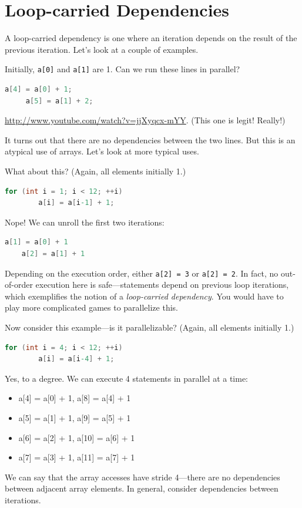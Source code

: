 \documentclass[a4paper]{report}
\begin{document}
\section*{Loop-carried Dependencies}
A loop-carried dependency is one where an
iteration depends on the result of the previous iteration. Let's look
at a couple of examples.


Initially, {\tt a[0]} and {\tt a[1]} are 1.
Can we run these lines in parallel?

\begin{lstlisting}[language=C]
     a[4] = a[0] + 1;
     a[5] = a[1] + 2;
\end{lstlisting}

\url{http://www.youtube.com/watch?v=jjXyqcx-mYY}. (This one is legit! Really!)

It turns out that there are no dependencies between the two lines. But this is
an atypical use of arrays. Let's look at more typical uses.


What about this? (Again, all elements initially 1.)

\begin{lstlisting}[language=C]
    for (int i = 1; i < 12; ++i)
        a[i] = a[i-1] + 1;
\end{lstlisting}

Nope! We can unroll the first two iterations:
\begin{lstlisting}[language=C]
    a[1] = a[0] + 1
    a[2] = a[1] + 1
\end{lstlisting}

Depending on the execution order, either {\tt a[2] = 3} or {\tt a[2] =
  2}.  In fact, no out-of-order execution here is safe---statements depend
on previous loop iterations, which exemplifies the notion of a
\emph{loop-carried dependency}. You would have
to play more complicated games to parallelize this.


  Now consider this example---is it parallelizable? (Again, all elements initially 1.)

\begin{lstlisting}[language=C]
    for (int i = 4; i < 12; ++i)
        a[i] = a[i-4] + 1;
\end{lstlisting}

Yes, to a degree. We can execute 4 statements in parallel at a time:
\begin{itemize}
  \item a[4] = a[0] + 1, a[8] = a[4] + 1
  \item a[5] = a[1] + 1, a[9] = a[5] + 1
  \item a[6] = a[2] + 1, a[10] = a[6] + 1
  \item a[7] = a[3] + 1, a[11] = a[7] + 1
\end{itemize}  
We can say that the array accesses have stride 4---there are no
dependencies between adjacent array elements. In general, consider
dependencies between iterations.
\end{document}
